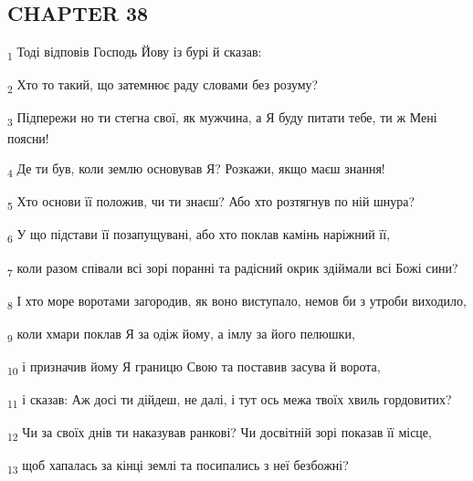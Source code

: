 \subsection{CHAPTER 38}
\begin{tcolorbox}
\textsubscript{1} Тоді відповів Господь Йову із бурі й сказав:
\end{tcolorbox}
\begin{tcolorbox}
\textsubscript{2} Хто то такий, що затемнює раду словами без розуму?
\end{tcolorbox}
\begin{tcolorbox}
\textsubscript{3} Підпережи но ти стегна свої, як мужчина, а Я буду питати тебе, ти ж Мені поясни!
\end{tcolorbox}
\begin{tcolorbox}
\textsubscript{4} Де ти був, коли землю основував Я? Розкажи, якщо маєш знання!
\end{tcolorbox}
\begin{tcolorbox}
\textsubscript{5} Хто основи її положив, чи ти знаєш? Або хто розтягнув по ній шнура?
\end{tcolorbox}
\begin{tcolorbox}
\textsubscript{6} У що підстави її позапущувані, або хто поклав камінь наріжний її,
\end{tcolorbox}
\begin{tcolorbox}
\textsubscript{7} коли разом співали всі зорі поранні та радісний окрик здіймали всі Божі сини?
\end{tcolorbox}
\begin{tcolorbox}
\textsubscript{8} І хто море воротами загородив, як воно виступало, немов би з утроби виходило,
\end{tcolorbox}
\begin{tcolorbox}
\textsubscript{9} коли хмари поклав Я за одіж йому, а імлу за його пелюшки,
\end{tcolorbox}
\begin{tcolorbox}
\textsubscript{10} і призначив йому Я границю Свою та поставив засува й ворота,
\end{tcolorbox}
\begin{tcolorbox}
\textsubscript{11} і сказав: Аж досі ти дійдеш, не далі, і тут ось межа твоїх хвиль гордовитих?
\end{tcolorbox}
\begin{tcolorbox}
\textsubscript{12} Чи за своїх днів ти наказував ранкові? Чи досвітній зорі показав її місце,
\end{tcolorbox}
\begin{tcolorbox}
\textsubscript{13} щоб хапалась за кінці землі та посипались з неї безбожні?
\end{tcolorbox}
